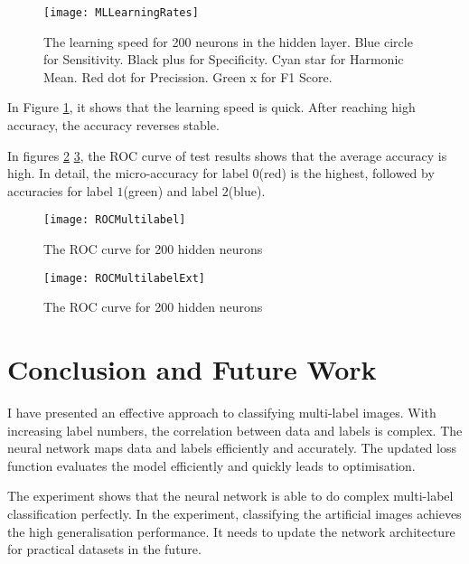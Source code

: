 \begin{figure}[htb]
\centering
\texttt{[image: MLLearningRates]}
\caption{\label{fig:MLLearningRates}The learning speed for 200 neurons in the hidden layer. Blue circle for Sensitivity. Black plus for Specificity. Cyan star for Harmonic Mean. Red dot for Precission. Green x for F1 Score.}
\end{figure}
In Figure \ref{fig:MLLearningRates}, it shows that the learning speed is quick. After reaching high accuracy, the accuracy reverses stable. 

In figures \ref{fig:MLROCCurve} \ref{fig:MLROCCurveExt}, the ROC curve of test results shows that the average accuracy is high. In detail, the micro-accuracy for label $0$(red) is the highest, followed by accuracies for label $1$(green) and label $2$(blue). 
\begin{figure}[htb]
\centering
\texttt{[image: ROCMultilabel]}
\caption{\label{fig:MLROCCurve}The ROC curve for 200 hidden neurons}
\end{figure}

\begin{figure}[htb]
\centering
\texttt{[image: ROCMultilabelExt]}
\caption{\label{fig:MLROCCurveExt}The ROC curve for 200 hidden neurons}
\end{figure}

\section{Conclusion and Future Work}

I have presented an effective approach to classifying multi-label images. With increasing label numbers, the correlation between data and labels is complex. The neural network maps data and labels efficiently and accurately. The updated loss function evaluates the model efficiently and quickly leads to optimisation.

The experiment shows that the neural network is able to do complex multi-label classification perfectly. In the experiment, classifying the artificial images achieves the high generalisation performance. It needs to update the network architecture for practical datasets in the future.












